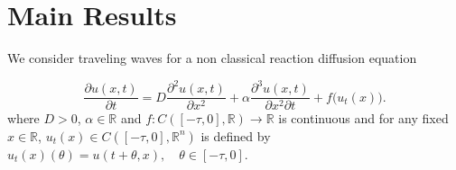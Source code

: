 \documentclass[12pt,letterpaper]{amsart}
\newtheorem{theorem}{Theorem}[section]
\theoremstyle{definition}
\theoremstyle{remark}
\numberwithin{equation}{section}
\begin{document}
 
 
 
 
 
 
 
 
 
% 
% 
%  
 
  
 
 
 
 
 \section{Main Results}\label{Main Results}
 
 
 We consider traveling waves for a non classical reaction diffusion equation 
 
\begin{equation}\label{Nonclassical}
	\frac{\partial u(x,t)}{\partial t}
	= D \frac{\partial^2 u(x,t)}{\partial x^2}
	+ \alpha \frac{\partial^3 u(x,t)}{\partial x^2 \partial t}
	+ f\big(u_t(x)\big).
\end{equation}
where $D>0$, $\alpha\in\mathbb R$   and
$f:C([-\tau,0],\mathbb R)\to\mathbb R$ is continuous and for any fixed $x \in \mathbb{R}$, $u_t(x) \in C([-\tau, 0], \mathbb{R}^n)$ is defined by  
$
u_t(x)(\theta) = u(t+\theta, x), \quad \theta \in [-\tau, 0].
$  
\end{document}
